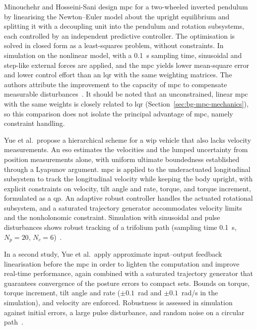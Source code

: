 Minouchehr and Hosseini-Sani design \ac{mpc} for a two-wheeled inverted pendulum by linearising the Newton--Euler model about the upright equilibrium and splitting it with a decoupling unit into the pendulum and rotation subsystems, each controlled by an independent predictive controller. The optimisation is solved in closed form as a least-squares problem, without constraints. In simulation on the nonlinear model, with a 0.1~s sampling time, sinusoidal and step-like external forces are applied, and the \ac{mpc} yields lower mean-square error and lower control effort than an \ac{lqr} with the same weighting matrices. The authors attribute the improvement to the capacity of \ac{mpc} to compensate measurable disturbances~\cite{minouchehr2015}. It should be noted that an unconstrained, linear \ac{mpc} with the same weights is closely related to \ac{lqr} (Section~\ref{sec:bg-mpc-mechanics}), so this comparison does not isolate the principal advantage of \ac{mpc}, namely constraint handling.

Yue et al.\ propose a hierarchical scheme for a \ac{wip} vehicle that also lacks velocity measurements. An \ac{eso} estimates the velocities and the lumped uncertainty from position measurements alone, with uniform ultimate boundedness established through a Lyapunov argument. \ac{mpc} is applied to the underactuated longitudinal subsystem to track the longitudinal velocity while keeping the body upright, with explicit constraints on velocity, tilt angle and rate, torque, and torque increment, formulated as a \ac{qp}. An adaptive robust controller handles the actuated rotational subsystem, and a saturated trajectory generator accommodates velocity limits and the nonholonomic constraint. Simulation with sinusoidal and pulse disturbances shows robust tracking of a trifolium path (sampling time 0.1~s, $N_p=20$, $N_c=6$)~\cite{yue2018tsmc}.

In a second study, Yue et al.\ apply approximate input--output feedback linearisation before the \ac{mpc} in order to lighten the computation and improve real-time performance, again combined with a saturated trajectory generator that guarantees convergence of the posture errors to compact sets. Bounds on torque, torque increment, tilt angle and rate ($\pm 0.1$~rad and $\pm 0.1$~rad/s in the simulation), and velocity are enforced. Robustness is assessed in simulation against initial errors, a large pulse disturbance, and random noise on a circular path~\cite{yue2018ijcas}.

